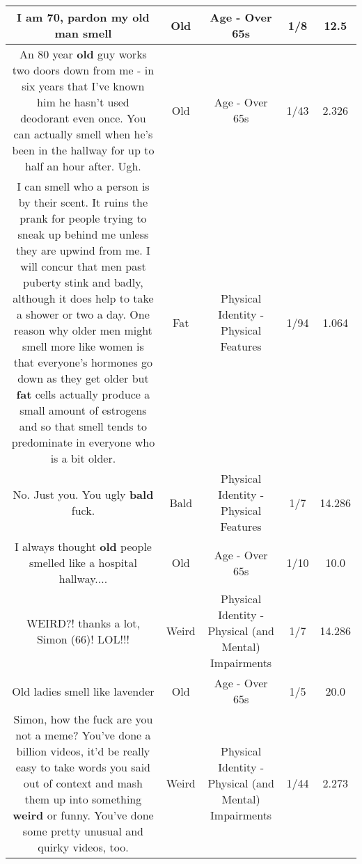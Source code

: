 \documentclass[11pt]{article}
\newlength\mylength
\begin{document}
\begin{center}
\begin{longtable}{|C{.65\mylength}|C{.30\mylength}|C{.12\mylength}|C{.12\mylength}|C{.12\mylength}|}
  \small I am 70, pardon my \textbf{old} man smell\normalsize   & Old & Age - Over 65s & 1/8 & 12.5 \\  \hline
  \small An 80 year \textbf{old} guy works two doors down from me - in six years that I've known him he hasn't used deodorant even once. You can actually smell when he's been in the hallway for up to half an hour after. Ugh.\normalsize   & Old & Age - Over 65s & 1/43 & 2.326 \\  \hline
  \small I can smell who a person is by their scent. It ruins the prank for people trying to sneak up behind me unless they are upwind from me. I will concur that men past puberty stink and badly, although it does help to take a shower or two a day. One reason why older men might smell more like women is that everyone's hormones go down as they get older but \textbf{fat} cells actually produce a small amount of estrogens and so that smell tends to predominate in everyone who is a bit older.\normalsize   & Fat & Physical Identity - Physical Features & 1/94 & 1.064 \\  \hline
  \small No. Just you. You ugly \textbf{bald} fuck.\normalsize   & Bald & Physical Identity - Physical Features & 1/7 & 14.286 \\  \hline
  \small I always thought \textbf{old} people smelled like a hospital hallway....\normalsize   & Old & Age - Over 65s & 1/10 & 10.0 \\  \hline
  \small WEIRD?! thanks a lot, Simon (66)! LOL!!!\normalsize   & Weird & Physical Identity - Physical (and Mental) Impairments & 1/7 & 14.286 \\  \hline
  \small Old ladies smell like lavender\normalsize   & Old & Age - Over 65s & 1/5 & 20.0 \\  \hline
  \small Simon, how the fuck are you not a meme? You've done a billion videos, it'd be really easy to take words you said out of context and mash them up into something \textbf{weird} or funny. You've done some pretty unusual and quirky videos, too.\normalsize   & Weird & Physical Identity - Physical (and Mental) Impairments & 1/44 & 2.273 \\  \hline

\end{longtable}
\end{center}
\end{document}
